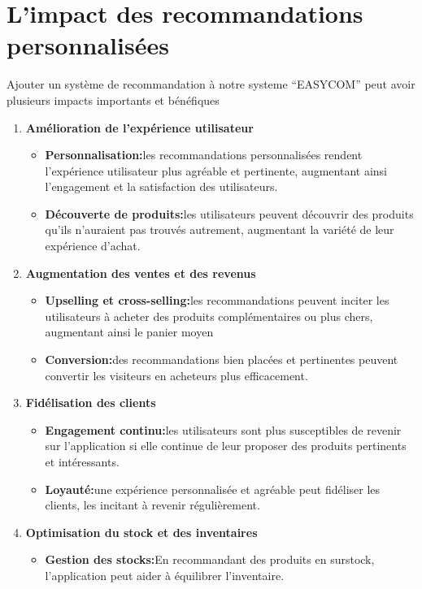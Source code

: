\documentclass[edit,12pt,a4paper,ChapStyle,oneside,doubleinterligne]{report}
\begin{document}
\section{L'impact des recommandations personnalisées}
Ajouter un système de recommandation à notre systeme “EASYCOM” peut avoir plusieurs impacts importants et bénéfiques
\begin{enumerate}
    \item \textbf{Amélioration de l'expérience utilisateur} \begin{itemize}
             \item \textbf{Personnalisation:}les recommandations personnalisées rendent l'expérience utilisateur plus agréable et pertinente, augmentant ainsi l'engagement et la satisfaction des utilisateurs.
             \item \textbf{Découverte de produits:}les utilisateurs peuvent découvrir des produits qu'ils n'auraient pas trouvés autrement, augmentant la variété de leur expérience d'achat.
            \end{itemize}
    \item \textbf{Augmentation des ventes et des revenus} \begin{itemize}
        \item \textbf{Upselling et cross-selling:}les recommandations peuvent inciter les utilisateurs à acheter des produits complémentaires ou plus chers, augmentant ainsi le panier moyen
        \item \textbf{Conversion:}des recommandations bien placées et pertinentes peuvent convertir les visiteurs en acheteurs plus efficacement.
    \end{itemize}
    \item \textbf{Fidélisation des clients} \begin{itemize}
        \item \textbf{Engagement continu:}les utilisateurs sont plus susceptibles de revenir sur l'application si elle continue de leur proposer des produits pertinents et intéressants.
        \item \textbf{Loyauté:}une expérience personnalisée et agréable peut fidéliser les clients, les incitant à revenir régulièrement.
    \end{itemize}
    \item \textbf{Optimisation du stock et des inventaires} \begin{itemize}
        \item \textbf{Gestion des stocks:}En recommandant des produits en surstock, l'application peut aider à équilibrer l'inventaire.

\end{itemize}
\end{enumerate}
\end{document}
